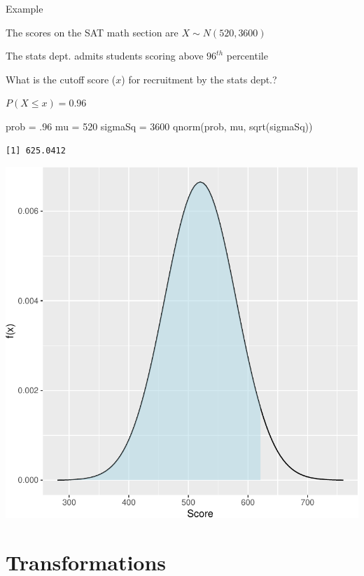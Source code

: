 \documentclass[
  letterpaper,
  DIV=11,
  numbers=noendperiod]{scrartcl}
\newenvironment{Shaded}{\begin{snugshade}}{\end{snugshade}}
\newcommand{\DecValTok}[1]{\textcolor[rgb]{0.68,0.00,0.00}{#1}}
\newcommand{\FunctionTok}[1]{\textcolor[rgb]{0.28,0.35,0.67}{#1}}
\newcommand{\NormalTok}[1]{\textcolor[rgb]{0.00,0.23,0.31}{#1}}
\newcommand{\OtherTok}[1]{\textcolor[rgb]{0.00,0.23,0.31}{#1}}
\begin{document}
{Example}

The scores on the SAT math section are \(X \sim N(520,3600)\)

The stats dept. admits students scoring above \(96^{th}\) percentile

What is the cutoff score (\(x\)) for recruitment by the stats dept.?

\(P(X \leq x) = 0.96\)

\begin{Shaded}
\begin{Highlighting}[]
\NormalTok{prob    }\OtherTok{=}\NormalTok{ .}\DecValTok{96}
\NormalTok{mu      }\OtherTok{=} \DecValTok{520}
\NormalTok{sigmaSq }\OtherTok{=} \DecValTok{3600}
\FunctionTok{qnorm}\NormalTok{(prob, mu, }\FunctionTok{sqrt}\NormalTok{(sigmaSq))}
\end{Highlighting}
\end{Shaded}

\begin{verbatim}
[1] 625.0412
\end{verbatim}

\includegraphics[width=1\linewidth,height=\textheight,keepaspectratio]{chapter3normal_files/figure-pdf/SATvalueNoEcho-1.pdf}

\section{Transformations}\label{transformations}
\end{document}
